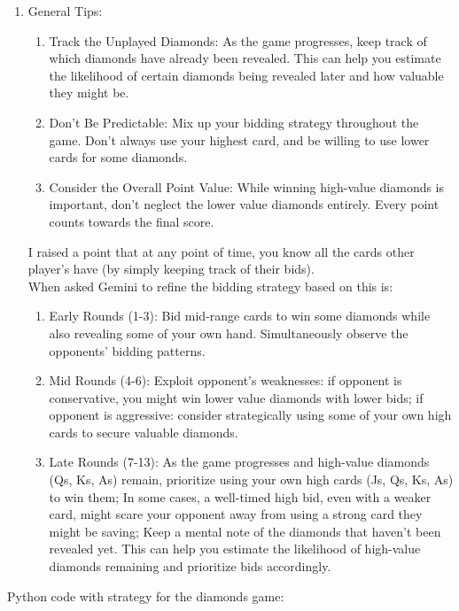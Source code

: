 \documentclass[a4paper,11pt,AutoFakeBold]{ctexart}
\begin{document}
\begin{enumerate}
    \item General Tips:
    \begin{enumerate} 
     \item Track the Unplayed Diamonds: As the game progresses, keep track of which diamonds have already been revealed. This can help you estimate the likelihood of certain diamonds being revealed later and how valuable they might be.
    \item Don't Be Predictable: Mix up your bidding strategy throughout the game. Don't always use your highest card, and be willing to use lower cards for some diamonds.
    \item Consider the Overall Point Value: While winning high-value diamonds is important, don't neglect the lower value diamonds entirely. Every point counts towards the final score.
    \end{enumerate} 
    I raised a point that at any point of time, you know all the cards other player's have (by simply keeping track of their bids). \\
    When asked Gemini to refine the bidding strategy based on this is:
    \begin{enumerate}
        \item Early Rounds (1-3):
        Bid mid-range cards to win some diamonds while also  revealing some of your own hand. Simultaneously observe the opponents' bidding patterns.
        \item Mid Rounds (4-6):
        Exploit opponent's weaknesses: if opponent is conservative, you might win lower value diamonds with lower bids; if opponent is aggressive: consider strategically using some of your own high cards to secure valuable diamonds.
        \item Late Rounds (7-13): As the game progresses and high-value diamonds (Qs, Ks, As) remain, prioritize using your own high cards (Js, Qs, Ks, As) to win them; In some cases, a well-timed high bid, even with a weaker card, might scare your opponent away from using a strong card they might be saving; Keep a mental note of the diamonds that haven't been revealed yet. This can help you estimate the likelihood of high-value diamonds remaining and prioritize bids accordingly.
    \end{enumerate}
 
\end{enumerate}
Python code with strategy for the diamonds game:
\end{document}
